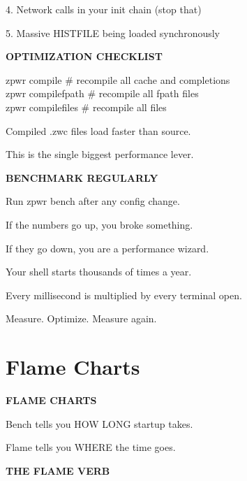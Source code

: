 \documentclass[11pt,a4paper,twoside]{book}
\begin{document}
4. Network calls in your init chain (stop that)

5. Massive HISTFILE being loaded synchronously


\vspace{12pt}
{\bfseries\color{neonyellow} OPTIMIZATION CHECKLIST}\vspace{4pt}

\begin{codebox}
zpwr compile        \# recompile all cache and completions\\
zpwr compilefpath    \# recompile all fpath files\\
zpwr compilefiles    \# recompile all files\\
\end{codebox}

Compiled .zwc files load faster than source.

This is the single biggest performance lever.


\vspace{12pt}
{\bfseries\color{neonyellow} BENCHMARK REGULARLY}\vspace{4pt}

\begin{codebox}
Run zpwr bench after any config change.\\
\end{codebox}

If the numbers go up, you broke something.

If they go down, you are a performance wizard.

Your shell starts thousands of times a year.

Every millisecond is multiplied by every terminal open.

Measure. Optimize. Measure again.


\vspace{16pt}

\section{Flame Charts}


\vspace{10pt}
{\large\bfseries\color{neoncyan} FLAME CHARTS}\vspace{6pt}

Bench tells you HOW LONG startup takes.

Flame tells you WHERE the time goes.


\vspace{12pt}
{\bfseries\color{neonyellow} THE FLAME VERB}\vspace{4pt}
\end{document}
